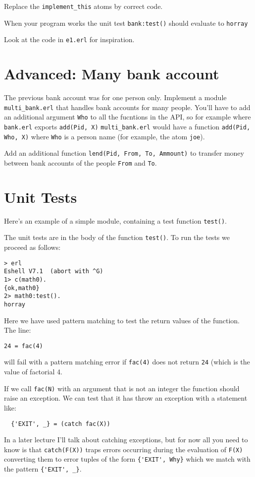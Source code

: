 \documentclass[12pt]{hitec}
\begin{document}
Replace the \verb+implement_this+ atoms by correct code. 


When your program works the unit test \verb+bank:test()+ should
evaluate to \verb+horray+

Look at the code in \verb+e1.erl+ for inspiration.

\section{Advanced: Many bank account}

The previous bank account was for one person only. Implement a module
\verb+multi_bank.erl+ that handles bank accounts for many
people. You'll have to add an additional argument \verb+Who+ to all
the fucntions in the API, so for example where \verb+bank.erl+ exports
\verb+add(Pid, X)+ \verb+multi_bank.erl+ would have a function
\verb+add(Pid, Who, X)+ where \verb+Who+ is a person name (for example, the
atom \verb+joe+).

Add an additional function \verb+lend(Pid, From, To, Ammount)+ to
transfer money between bank accounts of the people \verb+From+ and \verb+To+.

\section{Unit Tests}

Here's an example of a simple module, containing a test function \verb+test()+.


The unit tests are in the body of the function \verb+test()+. To run the tests
we proceed as follows:

\begin{verbatim}
> erl
Eshell V7.1  (abort with ^G)
1> c(math0).
{ok,math0}
2> math0:test().
horray
\end{verbatim}

Here we have used pattern matching to test the return values of the function.
The line:
\begin{verbatim}
24 = fac(4)
\end{verbatim}

will fail with a pattern matching error if \verb+fac(4)+ does not return  \verb+24+
(which is the value of factorial 4.

If we call \verb+fac(N)+ with an argument that is not an integer the function
should raise an exception. We can test that it has throw an exception with a
statement like:

\begin{verbatim}
  {'EXIT', _} = (catch fac(X))
\end{verbatim}

In a later lecture I'll talk about catching exceptions, but for now all you need
to know is that \verb+catch(F(X))+ traps errors occurring during the evaluation
of \verb+F(X)+ converting them to error tuples of the form \verb+{'EXIT', Why}+
which we match with the pattern \verb+{'EXIT', _}+.
\end{document}
